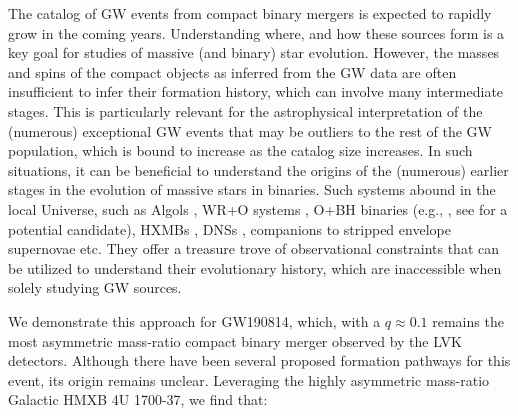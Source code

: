 \documentclass[linenumbers,trackchanges,twocolumn]{aastex701}
\begin{document}
The catalog of GW events from compact binary mergers is expected to rapidly grow in the coming years. Understanding where, and how these sources form is a key goal for studies of massive (and binary) star evolution. However, the masses and spins of the compact objects as inferred from the GW data are often insufficient to infer their formation history, which can involve many intermediate stages. This is particularly relevant for the astrophysical interpretation of the (numerous) exceptional GW events that may be outliers to the rest of the GW population, which is bound to increase as the catalog size increases. In such situations, it can be beneficial to understand the origins of the (numerous) earlier stages in the evolution of massive stars in binaries. Such systems abound in the local Universe, such as Algols \citep[e.g.,][]{2025arXiv251115347S}, WR+O systems \citep[e.g.,][]{1998NewA....3..443V, 2025A&A...695A.117N}, O+BH binaries (e.g., \citealp{2022NatAs...6.1085S}, see \citealp{2026arXiv260203650D} for a potential candidate), HXMBs \citep[e.g.,][]{2023A&A...671A.149F, 2026arXiv260208152K}, DNSs \citep[e.g.,][]{2018MNRAS.481.4009V}, companions to stripped envelope supernovae \citep[e.g.,][]{2017ApJ...842..125Z, 2026MNRAS.546f2208Z, 2026MNRAS.545f2163S} etc. They offer a treasure trove of observational constraints that can be utilized to understand their evolutionary history, which are inaccessible when solely studying GW sources.

We demonstrate this approach for GW190814, which, with a $q \approx 0.1$ remains the most asymmetric mass-ratio compact binary merger observed by the LVK detectors. Although there have been several proposed formation pathways for this event, its origin remains unclear. Leveraging the highly asymmetric mass-ratio Galactic HMXB 4U 1700-37, we find that:
\end{document}
